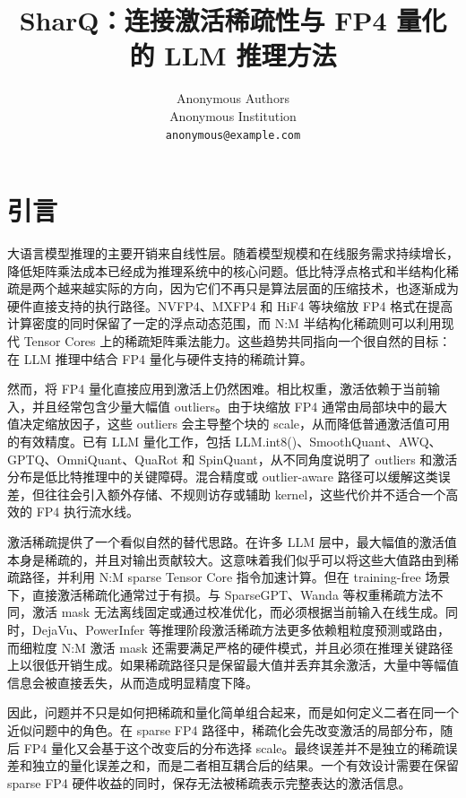 \documentclass{article}
\title{SharQ：连接激活稀疏性与 FP4 量化的 LLM 推理方法}
\author{%
  Anonymous Authors \\
  Anonymous Institution \\
  \texttt{anonymous@example.com} \\
}
\begin{document}
\maketitle

\begin{abstract}
\end{abstract}

\section{引言}

大语言模型推理的主要开销来自线性层。随着模型规模和在线服务需求持续增长，降低矩阵乘法成本已经成为推理系统中的核心问题。低比特浮点格式和半结构化稀疏是两个越来越实际的方向，因为它们不再只是算法层面的压缩技术，也逐渐成为硬件直接支持的执行路径。NVFP4、MXFP4 和 HiF4 等块缩放 FP4 格式在提高计算密度的同时保留了一定的浮点动态范围，而 N:M 半结构化稀疏则可以利用现代 Tensor Cores 上的稀疏矩阵乘法能力。这些趋势共同指向一个很自然的目标：在 LLM 推理中结合 FP4 量化与硬件支持的稀疏计算。

然而，将 FP4 量化直接应用到激活上仍然困难。相比权重，激活依赖于当前输入，并且经常包含少量大幅值 outliers。由于块缩放 FP4 通常由局部块中的最大值决定缩放因子，这些 outliers 会主导整个块的 scale，从而降低普通激活值可用的有效精度。已有 LLM 量化工作，包括 LLM.int8()、SmoothQuant、AWQ、GPTQ、OmniQuant、QuaRot 和 SpinQuant，从不同角度说明了 outliers 和激活分布是低比特推理中的关键障碍。混合精度或 outlier-aware 路径可以缓解这类误差，但往往会引入额外存储、不规则访存或辅助 kernel，这些代价并不适合一个高效的 FP4 执行流水线。

激活稀疏提供了一个看似自然的替代思路。在许多 LLM 层中，最大幅值的激活值本身是稀疏的，并且对输出贡献较大。这意味着我们似乎可以将这些大值路由到稀疏路径，并利用 N:M sparse Tensor Core 指令加速计算。但在 training-free 场景下，直接激活稀疏化通常过于有损。与 SparseGPT、Wanda 等权重稀疏方法不同，激活 mask 无法离线固定或通过校准优化，而必须根据当前输入在线生成。同时，DejaVu、PowerInfer 等推理阶段激活稀疏方法更多依赖粗粒度预测或路由，而细粒度 N:M 激活 mask 还需要满足严格的硬件模式，并且必须在推理关键路径上以很低开销生成。如果稀疏路径只是保留最大值并丢弃其余激活，大量中等幅值信息会被直接丢失，从而造成明显精度下降。

因此，问题并不只是如何把稀疏和量化简单组合起来，而是如何定义二者在同一个近似问题中的角色。在 sparse FP4 路径中，稀疏化会先改变激活的局部分布，随后 FP4 量化又会基于这个改变后的分布选择 scale。最终误差并不是独立的稀疏误差和独立的量化误差之和，而是二者相互耦合后的结果。一个有效设计需要在保留 sparse FP4 硬件收益的同时，保存无法被稀疏表示完整表达的激活信息。
\end{document}
